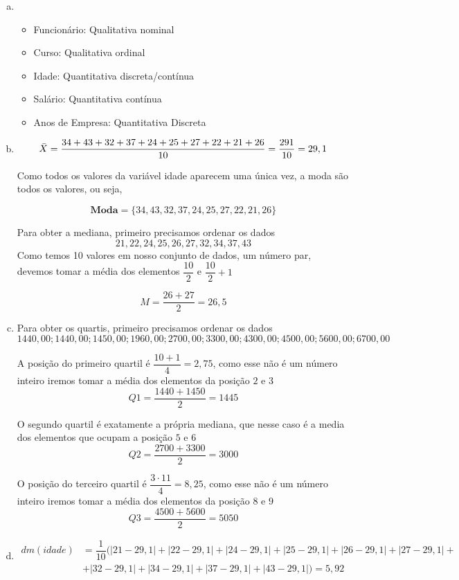 \documentclass{article}
\begin{document}
\begin{enumerate}[a)]
\item 
\begin{itemize}
    \item Funcionário: Qualitativa nominal
    \item Curso: Qualitativa ordinal
    \item Idade: Quantitativa discreta/contínua
    \item Salário: Quantitativa contínua
    \item Anos de Empresa: Quantitativa Discreta
\end{itemize}
\item 
$$\Bar{X} = \dfrac{34+43+32+37+24+25+27+22+21+26}{10} = \dfrac{291}{10} = 29,1$$

Como todos os valores da variável idade aparecem uma única vez, a moda são todos os valores, ou seja, 

$$\textbf{Moda} = \{34,43,32,37,24,25,27,22,21,26\}$$

Para obter a mediana, primeiro precisamos ordenar os dados
$$21, 22, 24, 25, 26, 27, 32, 34, 37, 43$$
Como temos 10 valores em nosso conjunto de dados, um número par, devemos tomar a média dos elementos $\dfrac{10}{2}$ e $\dfrac{10}{2}+1$

$$M =\dfrac{26+27}{2} = 26,5 $$
\item

Para obter os quartis, primeiro precisamos ordenar os dados
$$1440,00; 1440,00; 1450,00; 1960,00; 2700,00; 3300,00; 4300,00; 4500,00; 5600,00; 6700,00$$

A posição do primeiro quartil é $\dfrac{10 + 1}{4} = 2,75$, como esse não é um número inteiro iremos tomar a média dos elementos da posição $2$ e $3$
$$Q1 = \dfrac{1440 + 1450}{2} = 1445 $$

O segundo quartil é exatamente a própria mediana, que nesse caso é a media dos elementos que ocupam a posição $5$ e $6$
$$Q2 = \dfrac{2700 + 3300}{2}=3000$$

O posição do terceiro quartil é $\dfrac{3\cdot 11}{4} = 8,25$, como esse não é um número inteiro iremos tomar a média dos elementos da posição $8$ e $9$
$$Q3 = \dfrac{4500+5600}{2} = 5050$$
\item 
{\tiny\begin{align*}
    dm(idade)&=\dfrac{1}{10}(|21-29,1| + |22-29,1| + |24 - 29,1| +|25-29,1| + |26-29,1| + |27-29,1|+\\
    &+ |32-29,1| + |34-29,1| + |37-29,1| + |43-29,1|) = 5,92
\end{align*}}


\end{enumerate}
\end{document}
